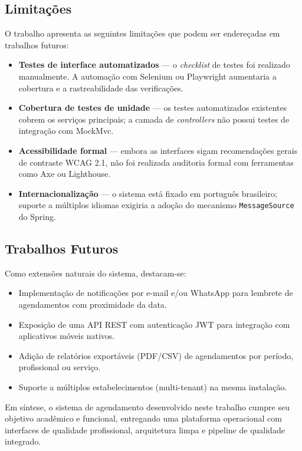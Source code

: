 \subsection{Limitações}

O trabalho apresenta as seguintes limitações que podem ser endereçadas em
trabalhos futuros:

\begin{itemize}
  \item \textbf{Testes de interface automatizados} — o \textit{checklist} de
    testes foi realizado manualmente.  A automação com Selenium ou Playwright
    aumentaria a cobertura e a rastreabilidade das verificações.
  \item \textbf{Cobertura de testes de unidade} — os testes automatizados
    existentes cobrem os serviços principais; a camada de \textit{controllers}
    não possui testes de integração com MockMvc.
  \item \textbf{Acessibilidade formal} — embora as interfaces sigam
    recomendações gerais de contraste WCAG 2.1, não foi realizada auditoria
    formal com ferramentas como Axe ou Lighthouse.
  \item \textbf{Internacionalização} — o sistema está fixado em português
    brasileiro; suporte a múltiplos idiomas exigiria a adoção do mecanismo
    \texttt{MessageSource} do Spring.
\end{itemize}

\subsection{Trabalhos Futuros}

Como extensões naturais do sistema, destacam-se:

\begin{itemize}
  \item Implementação de notificações por e-mail e/ou WhatsApp para lembrete
    de agendamentos com proximidade da data.
  \item Exposição de uma API REST com autenticação JWT para integração com
    aplicativos móveis nativos.
  \item Adição de relatórios exportáveis (PDF/CSV) de agendamentos por
    período, profissional ou serviço.
  \item Suporte a múltiplos estabelecimentos (multi-tenant) na mesma
    instalação.
\end{itemize}

Em síntese, o sistema de agendamento desenvolvido neste trabalho cumpre seu
objetivo acadêmico e funcional, entregando uma plataforma operacional com
interfaces de qualidade profissional, arquitetura limpa e pipeline de
qualidade integrado.


